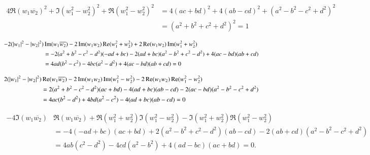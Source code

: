 \documentclass[a4paper, 12pt]{article}
\theoremstyle{Mydefinition}
\theoremstyle{Mytheorem}
\begin{document}
\begin{equation*}
\begin{split}
    4\Re(w_1\overline{w_2})^2 + \Im(w_1^2-w_2^2)^2 + \Re(w_1^2-w_2^2)^2 &= 4(ac+bd)^2 + 4(ab-cd)^2 + (a^2-b^2-c^2+d^2)^2 \\
    &=(a^2+b^2+c^2+d^2)^2 = 1
\end{split}
\end{equation*}

\begin{equation*}
\begin{split}
    -2(\abs{w_1}^2-\abs{w_2}^2)&\Im(w_1\overline{w_2})-2\Im(w_1w_2)\Re(w_1^2+w_2^2) + 2\Re(w_1w_2)\Im(w_1^2+w_2^2)\\
    &=-2(a^2+b^2-c^2-d^2)(-ad+bc) - 2(ad+bc)(a^2-b^2+c^2-d^2) + 4(ac-bd)(ab+cd)\\
    &=4ad(b^2-c^2)-4bc(a^2-d^2) + 4(ac-bd)(ab+cd) = 0
\end{split}
\end{equation*}

\begin{equation*}
\begin{split}
    2(\abs{w_1}^2-\abs{w_2}^2)&\Re(w_1\overline{w_2})-2\Im(w_1w_2)\Im(w_1^2-w_2^2) - 2\Re(w_1w_2)\Re(w_1^2-w_2^2)\\
    &=2(a^2+b^2-c^2-d^2)(ac+bd) - 4(ad+bc)(ab-cd) - 2(ac-bd)(a^2-b^2-c^2+d^2)\\
    &=4ac(b^2-d^2)+4bd(a^2-c^2) - 4(ad+bc)(ab-cd) = 0
\end{split}
\end{equation*}


\begin{equation*}
\begin{split}
    -4\Im(w_1\overline{w_2})&\Re(w_1\overline{w_2})+\Re(w_1^2+w_2^2)\Im(w_1^2-w_2^2) - \Im(w_1^2+w_2^2)\Re(w_1^2-w_2^2)\\
    &=-4(-ad+bc)(ac+bd) + 2(a^2-b^2+c^2-d^2)(ab-cd) - 2(ab+cd)(a^2-b^2-c^2+d^2)\\
    &=4ab(c^2-d^2)-4cd(a^2-b^2) +4(ad-bc)(ac+bd) = 0.
\end{split}
\end{equation*}
\end{document}
